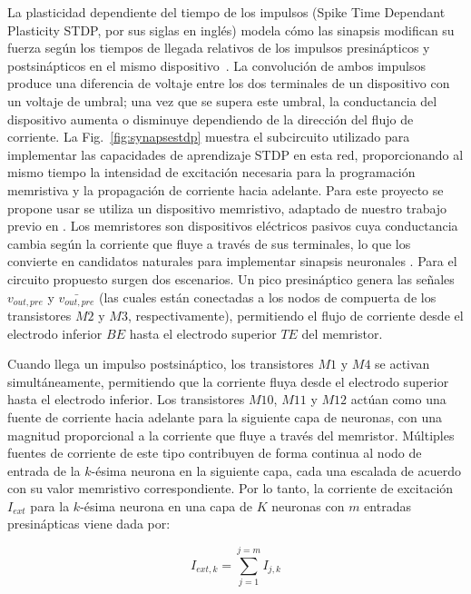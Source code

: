 \documentclass[letter, 12pt]{article}
\begin{document}
La plasticidad dependiente del tiempo de los impulsos (Spike Time Dependant Plasticity STDP, por sus siglas en inglés) \cite{Salvador2024} modela cómo las sinapsis modifican su fuerza según los tiempos de llegada relativos de los impulsos presinápticos y postsinápticos en el mismo dispositivo~\cite{Yi2023Survey}. La convolución de ambos impulsos produce una diferencia de voltaje entre los dos terminales de un dispositivo con un voltaje de umbral; una vez que se supera este umbral, la conductancia del dispositivo aumenta o disminuye dependiendo de la dirección del flujo de corriente. La Fig.~\ref{fig:synapsestdp} muestra el subcircuito utilizado para implementar las capacidades de aprendizaje STDP en esta red, proporcionando al mismo tiempo la intensidad de excitación necesaria para la programación memristiva y la propagación de corriente hacia adelante. Para este proyecto se propone usar se utiliza un dispositivo memristivo, adaptado de nuestro trabajo previo en \cite{math12142267}. Los memristores son dispositivos eléctricos pasivos cuya conductancia cambia según la corriente que fluye a través de sus terminales, lo que los convierte en candidatos naturales para implementar sinapsis neuronales \cite{Xia2019}. Para el circuito propuesto surgen dos escenarios. Un pico presináptico genera las señales $v_{out,pre}$ y $\bar{v_{out,pre}}$ (las cuales están conectadas a los nodos de compuerta de los transistores $M2$ y $M3$, respectivamente), permitiendo el flujo de corriente desde el electrodo inferior $BE$ hasta el electrodo superior $TE$ del memristor.

Cuando llega un impulso postsináptico, los transistores $M1$ y $M4$ se activan simultáneamente, permitiendo que la corriente fluya desde el electrodo superior hasta el electrodo inferior. Los transistores $M10$, $M11$ y $M12$ actúan como una fuente de corriente hacia adelante para la siguiente capa de neuronas, con una magnitud proporcional a la corriente que fluye a través del memristor. Múltiples fuentes de corriente de este tipo contribuyen de forma continua al nodo de entrada de la $k$-ésima neurona en la siguiente capa, cada una escalada de acuerdo con su valor memristivo correspondiente. Por lo tanto, la corriente de excitación $I_{ext}$ para la $k$-ésima neurona en una capa de $K$ neuronas con $m$ entradas presinápticas viene dada por:

\begin{equation}
    I_{ext, k} = \sum^{j=m}_{j=1} I_{j,k}
    \label{eq:currSumEq}
\end{equation}
\end{document}
